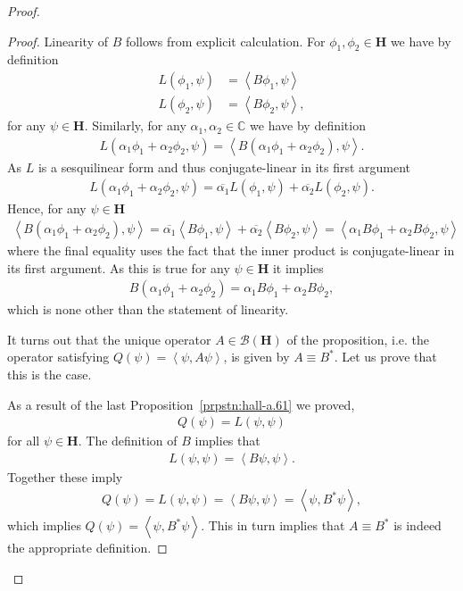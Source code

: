 \begin{proof}
\begin{proof}
Linearity of $B$ follows from explicit calculation. For $\phi_1, \phi_2 \in \mathbf{H}$ we have by definition
\begin{align}
    L(\phi_1, \psi) &= \left< B\phi_1, \psi \right> \\
    L(\phi_2, \psi) &= \left< B\phi_2, \psi \right>,
\end{align}
for any $\psi \in \mathbf{H}$. Similarly, for any $\alpha_1, \alpha_2 \in \mathbb{C}$ we have by definition
\begin{align}
    L(\alpha_1 \phi_1 + \alpha_2 \phi_2 , \psi) = \left< B(\alpha_1 \phi_1 + \alpha_2 \phi_2), \psi \right>.
\end{align}
As $L$ is a sesquilinear form and thus conjugate-linear in its first argument
\begin{align}
    L(\alpha_1\phi_1 + \alpha_2\phi_2, \psi) = \overline{\alpha_1} L(\phi_1, \psi) + \overline{\alpha_2} L(\phi_2, \psi).
\end{align}
Hence, for any $\psi \in \mathbf{H}$
\begin{align}
    \left< B(\alpha_1 \phi_1 + \alpha_2 \phi_2), \psi \right> = \overline{\alpha_1} \left< B\phi_1, \psi \right> + \overline{\alpha_2}  \left< B\phi_2, \psi \right> = \left< \alpha_1 B\phi_1 + \alpha_2 B\phi_2, \psi \right>
\end{align}
where the final equality uses the fact that the inner product is conjugate-linear in its first argument. As this is true for any $\psi \in \mathbf{H}$ it implies
\begin{align}
    B(\alpha_1 \phi_1 + \alpha_2 \phi_2) =  \alpha_1 B\phi_1 + \alpha_2 B\phi_2,
\end{align}
which is none other than the statement of linearity.

It turns out that the unique operator $A \in \mathcal{B}(\mathbf{H})$ of the proposition, i.e. the operator satisfying $Q(\psi) = \left< \psi, A \psi \right>$, is given by $A \equiv B^*$. Let us prove that this is the case.

As a result of the last Proposition~\ref{prpstn:hall-a.61} we proved,
\begin{align}
    Q(\psi) = L(\psi, \psi)
\end{align}
for all $\psi \in \mathbf{H}$. The definition of $B$ implies that
\begin{align}
    L(\psi, \psi) = \left< B\psi, \psi \right>.
\end{align}
Together these imply
\begin{align}
    Q(\psi) = L(\psi, \psi) = \left< B\psi, \psi \right> = \left< \psi, B^*\psi \right>,
\end{align}
which implies $Q(\psi) = \left< \psi, B^*\psi \right>$. This in turn implies that $A \equiv B^*$ is indeed the appropriate definition.


\end{proof}
\end{proof}
